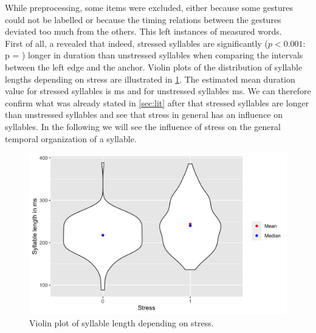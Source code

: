 \documentclass[../Proposal.tex]{subfiles}
\begin{document}
While preprocessing, some items were excluded, either because some gestures could not be labelled or because the timing relations between the gestures deviated too much from the others. This left  instances of measured words.\\
First of all, a  revealed that indeed, stressed syllables are significantly  ($p<0.001$: p = ) longer in duration than unstressed syllables when comparing the intervals between the left edge and the anchor. Violin plots of the distribution of syllable lengths depending on stress are illustrated in \cref{fig:syll_length}. The estimated mean duration value for stressed syllables is ms and for unstressed syllables ms.
We can therefore confirm what was already stated in \cref{sec:lit} after \cite{prieto2018prosody} that stressed syllables are longer than unstressed syllables and see that stress in general has an influence on syllables. 
In the following we will see the influence of stress on the general temporal organization of a syllable.\\

\begin{figure}
    \centering
    \includegraphics[width=12cm]{figures/syll_length.png}
    \caption{Violin plot of syllable length depending on stress.}
    \label{fig:syll_length}
\end{figure}
 
\end{document}
